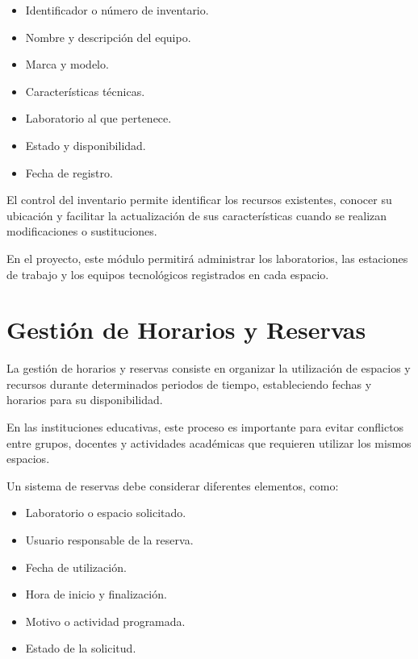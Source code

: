 \begin{itemize}

    \item Identificador o número de inventario.
    \item Nombre y descripción del equipo.
    \item Marca y modelo.
    \item Características técnicas.
    \item Laboratorio al que pertenece.
    \item Estado y disponibilidad.
    \item Fecha de registro.

\end{itemize}

El control del inventario permite identificar los recursos existentes, conocer su ubicación y facilitar la actualización de sus características cuando se realizan modificaciones o sustituciones.

En el proyecto, este módulo permitirá administrar los laboratorios, las estaciones de trabajo y los equipos tecnológicos registrados en cada espacio.

\section{Gestión de Horarios y Reservas}

La gestión de horarios y reservas consiste en organizar la utilización de espacios y recursos durante determinados periodos de tiempo, estableciendo fechas y horarios para su disponibilidad.

En las instituciones educativas, este proceso es importante para evitar conflictos entre grupos, docentes y actividades académicas que requieren utilizar los mismos espacios.

Un sistema de reservas debe considerar diferentes elementos, como:

\begin{itemize}

    \item Laboratorio o espacio solicitado.
    \item Usuario responsable de la reserva.
    \item Fecha de utilización.
    \item Hora de inicio y finalización.
    \item Motivo o actividad programada.
    \item Estado de la solicitud.

\end{itemize}

